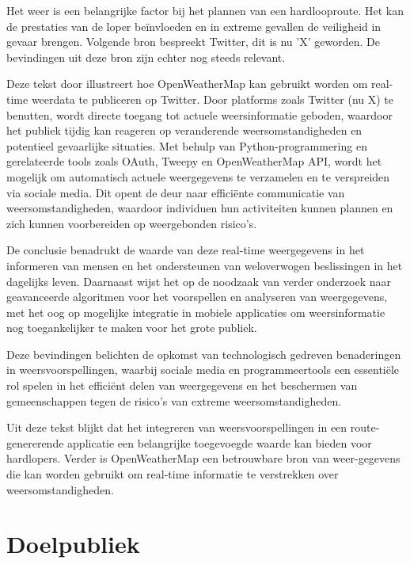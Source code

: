     Het weer is een belangrijke factor bij het plannen van een hardlooproute. Het kan de prestaties van de loper beïnvloeden en in extreme gevallen de veiligheid in gevaar brengen.
    Volgende bron bespreekt Twitter, dit is nu 'X' geworden. De bevindingen uit deze bron zijn echter nog steeds relevant.

    Deze tekst door \textcite{dewi2019} illustreert hoe OpenWeatherMap kan gebruikt worden om real-time weerdata te publiceren op Twitter.
    Door platforms zoals Twitter (nu X) te benutten, wordt directe toegang tot actuele weersinformatie geboden, waardoor het publiek tijdig kan reageren op veranderende weersomstandigheden en potentieel gevaarlijke situaties.
    Met behulp van Python-programmering en gerelateerde tools zoals OAuth, Tweepy en OpenWeatherMap API, wordt het mogelijk om automatisch actuele weergegevens te verzamelen en te verspreiden via sociale media. 
    Dit opent de deur naar efficiënte communicatie van weersomstandigheden, waardoor individuen hun activiteiten kunnen plannen en zich kunnen voorbereiden op weergebonden risico's.

    De conclusie benadrukt de waarde van deze real-time weergegevens in het informeren van mensen en het ondersteunen van weloverwogen beslissingen in het dagelijks leven. 
    Daarnaast wijst het op de noodzaak van verder onderzoek naar geavanceerde algoritmen voor het voorspellen en analyseren van weergegevens, 
    met het oog op mogelijke integratie in mobiele applicaties om weersinformatie nog toegankelijker te maken voor het grote publiek.

    Deze bevindingen belichten de opkomst van technologisch gedreven benaderingen in weersvoorspellingen, waarbij sociale media en programmeertools een essentiële rol spelen 
    in het efficiënt delen van weergegevens en het beschermen van gemeenschappen tegen de risico's van extreme weersomstandigheden.
    \autocite{dewi2019}

    Uit deze tekst blijkt dat het integreren van weersvoorspellingen in een route-genererende applicatie een belangrijke toegevoegde waarde kan bieden voor hardlopers. 
    Verder is OpenWeatherMap een betrouwbare bron van weer-gegevens die kan worden gebruikt om real-time informatie te verstrekken over weersomstandigheden.


    \section{Doelpubliek}

